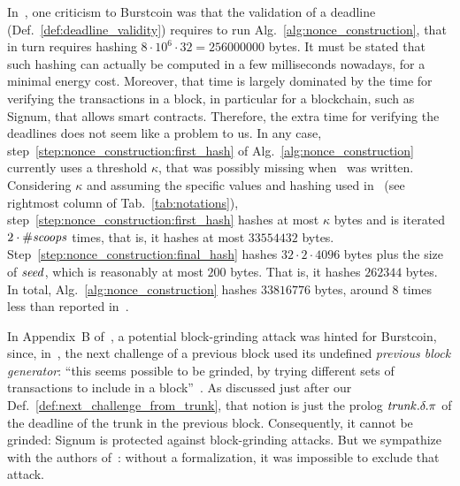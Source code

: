 In~\cite{ParkKFGAP18}, one criticism to Burstcoin was that the validation of a deadline
(Def.~\ref{def:deadline_validity}) requires to run
Alg.~\ref{alg:nonce_construction}, that in turn
requires hashing $8\cdot 10^6\cdot 32=256000000$ bytes.
It must be stated that
such hashing can actually be computed in a few milliseconds nowadays,
for a minimal energy cost. Moreover, that time is largely dominated
by the time for verifying the transactions in a block, in particular
for a blockchain, such as Signum, that allows smart contracts.
Therefore, the extra time for verifying the deadlines does not seem like a problem to us.
In any case, step~\ref{step:nonce_construction:first_hash} of
Alg.~\ref{alg:nonce_construction} currently uses a threshold $\kappa$,
that was possibly missing when~\cite{ParkKFGAP18} was written.
Considering $\kappa$ and assuming the specific values and hashing
used in~\cite{SignumPlotting} (see rightmost column of Tab.~\ref{tab:notations}),
step~\ref{step:nonce_construction:first_hash}
hashes at most $\kappa$ bytes and is iterated $2\cdot{\#\mathit{scoops}}$ times, that is,
it hashes at most $33554432$ bytes.
Step~\ref{step:nonce_construction:final_hash} hashes $32\cdot 2\cdot 4096$ bytes
plus the size of ${\mathit{seed}}$, which is reasonably at most $200$ bytes.
That is, it hashes $262344$ bytes. In total, Alg.~\ref{alg:nonce_construction}
hashes $33816776$ bytes, around $8$ times less than reported in~\cite{ParkKFGAP18}.

In Appendix~B of~\cite{ParkKFGAP18}, a potential block-grinding attack was hinted for Burstcoin,
since, in~\cite{SignumPlotting}, the next challenge of a previous block used its undefined
\emph{previous block generator}:
``this seems possible to be grinded, by trying
different sets of transactions to include in a block''~\cite{ParkKFGAP18}.
As discussed just after our Def.~\ref{def:next_challenge_from_trunk}, that notion is
just the prolog ${\mathit{trunk}}.\delta.\pi$ of the deadline of the trunk in the previous block.
Consequently, it cannot be grinded: Signum is protected against block-grinding attacks.
But we sympathize with the authors of~\cite{ParkKFGAP18}: without a formalization,
it was impossible to exclude that attack.

